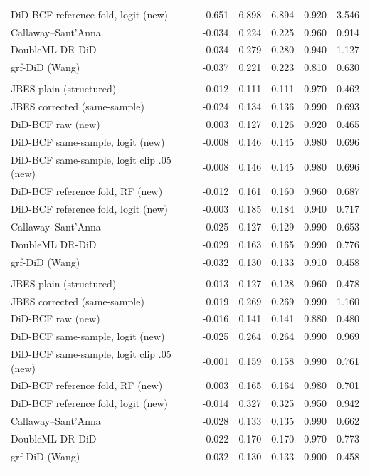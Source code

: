 {\begin{longtable}{lrrrrr}
\quad DiD-BCF reference fold, logit (new) & 0.651 & 6.898 & 6.894 & 0.920 & 3.546 \\
\quad Callaway--Sant'Anna & -0.034 & 0.224 & 0.225 & 0.960 & 0.914 \\
\quad DoubleML DR-DiD & -0.034 & 0.279 & 0.280 & 0.940 & 1.127 \\
\quad grf-DiD (Wang) & -0.037 & 0.221 & 0.223 & 0.810 & 0.630 \\
\addlinespace
\multicolumn{6}{l}{\textit{serial, $N=200$, degree $d=1$}} \\
\quad JBES plain (structured) & -0.012 & 0.111 & 0.111 & 0.970 & 0.462 \\
\quad JBES corrected (same-sample) & -0.024 & 0.134 & 0.136 & 0.990 & 0.693 \\
\quad DiD-BCF raw (new) & 0.003 & 0.127 & 0.126 & 0.920 & 0.465 \\
\quad DiD-BCF same-sample, logit (new) & -0.008 & 0.146 & 0.145 & 0.980 & 0.696 \\
\quad DiD-BCF same-sample, logit clip .05 (new) & -0.008 & 0.146 & 0.145 & 0.980 & 0.696 \\
\quad DiD-BCF reference fold, RF (new) & -0.012 & 0.161 & 0.160 & 0.960 & 0.687 \\
\quad DiD-BCF reference fold, logit (new) & -0.003 & 0.185 & 0.184 & 0.940 & 0.717 \\
\quad Callaway--Sant'Anna & -0.025 & 0.127 & 0.129 & 0.990 & 0.653 \\
\quad DoubleML DR-DiD & -0.029 & 0.163 & 0.165 & 0.990 & 0.776 \\
\quad grf-DiD (Wang) & -0.032 & 0.130 & 0.133 & 0.910 & 0.458 \\
\addlinespace
\multicolumn{6}{l}{\textit{serial, $N=200$, degree $d=2$}} \\
\quad JBES plain (structured) & -0.013 & 0.127 & 0.128 & 0.960 & 0.478 \\
\quad JBES corrected (same-sample) & 0.019 & 0.269 & 0.269 & 0.990 & 1.160 \\
\quad DiD-BCF raw (new) & -0.016 & 0.141 & 0.141 & 0.880 & 0.480 \\
\quad DiD-BCF same-sample, logit (new) & -0.025 & 0.264 & 0.264 & 0.990 & 0.969 \\
\quad DiD-BCF same-sample, logit clip .05 (new) & -0.001 & 0.159 & 0.158 & 0.990 & 0.761 \\
\quad DiD-BCF reference fold, RF (new) & 0.003 & 0.165 & 0.164 & 0.980 & 0.701 \\
\quad DiD-BCF reference fold, logit (new) & -0.014 & 0.327 & 0.325 & 0.950 & 0.942 \\
\quad Callaway--Sant'Anna & -0.028 & 0.133 & 0.135 & 0.990 & 0.662 \\
\quad DoubleML DR-DiD & -0.022 & 0.170 & 0.170 & 0.970 & 0.773 \\
\quad grf-DiD (Wang) & -0.032 & 0.130 & 0.133 & 0.900 & 0.458 \\
\addlinespace
\end{longtable}
}

